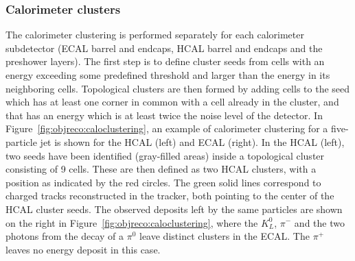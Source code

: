 \subsubsection{Calorimeter clusters}
 The calorimeter clustering is performed separately for each calorimeter subdetector (ECAL barrel and endcaps, HCAL barrel and endcaps and the preshower layers).
The first step is to define cluster seeds from cells with an energy exceeding some predefined threshold and larger than the energy in its neighboring cells. Topological clusters are then formed by adding cells to the seed which has at least one corner in common with a cell already in the cluster, and that has an energy which is at least twice the noise level of the detector. In Figure~\ref{fig:objreco:caloclustering}, an example of calorimeter clustering for a five-particle jet is shown for the HCAL (left) and ECAL (right). In the HCAL (left), two seeds have been identified (gray-filled areas) inside a topological cluster consisting of 9 cells. These are then defined as two HCAL clusters, with a position as indicated by the red circles. The green solid lines correspond to charged tracks reconstructed in the tracker, both pointing to the center of the HCAL cluster seeds. The observed deposits left by the same particles are shown on the right in Figure~\ref{fig:objreco:caloclustering}, where the $K^0_L$, $\pi^-$ and the two photons from the decay of a $\pi^0$ leave distinct clusters in the ECAL. The $\pi^+$ leaves no energy deposit in this case. 
